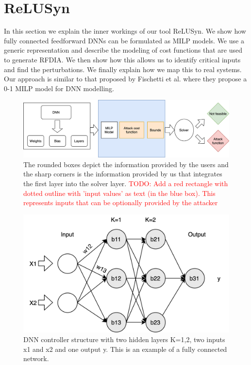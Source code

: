\chapter{ReLUSyn}
In this section we explain the inner workings of our tool ReLUSyn. 
We show how fully connected feedforward \ac{DNN}s can be formulated as \ac{MILP} models. 
We use a generic representation and describe the modeling of cost functions that are used to generate \ac{RFDIA}.
We then show how this allows us to identify critical inputs and find the perturbations. 
We finally explain how we map this to real systems.
Our approach is similar to that proposed by Fischetti et al. \cite{fischetti2017deep} where they propose a 0-1 MILP model for DNN modelling.
\begin{figure}
	\centering
	\includegraphics[scale=0.1]{Images/Methodology}
	\caption[Methodology]{The rounded boxes depict the information provided by the users and the sharp corners is the information provided by us that integrates the first layer into the solver layer. \textcolor{red}{TODO: Add a red rectangle with dotted outline with 'input values' as text (in the blue box). This represents inputs that can be optionally provided by the attacker}}
	\label{fig:methodology}
\end{figure}

\begin{figure}
	\centering
	\includegraphics[width=0.7\linewidth]{Images/DNNstructure}
	\caption[DNN structure]{DNN controller structure with two hidden layers K=1,2, two inputs x1 and x2 and one output y. This is an example of a fully connected network.}
	\label{fig:dnn-controller}
\end{figure}


